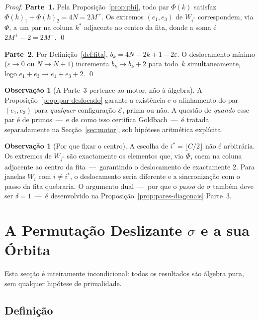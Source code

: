 \documentclass[12pt, a4paper]{article}
\theoremstyle{plain}
\theoremstyle{definition}
\newtheorem{remark}[theorem]{Observação}
\theoremstyle{remark}
\begin{document}
	\begin{proof}
		\textbf{Parte~1.}  Pela Proposição~\ref{prop:phi}, todo par
		$\Phi(k)$ satisfaz $\Phi(k)_1+\Phi(k)_2=4N=2M^+$.  Os extremos
		$(e_1,e_3)$ de $W_{i^*}$ correspondem, via $\Phi$, a um par na
		coluna $k^*$ adjacente ao centro da fita, donde a soma é
		$2M^+-2=2M^-$. \qed
		
		\textbf{Parte~2.}  Por Definição~\ref{def:fita},
		$b_k=4N-2k+1-2\varepsilon$.  O deslocamento mínimo
		($\varepsilon\to0$ ou $N\to N+1$) incrementa $b_k\to b_k+2$ para
		todo~$k$ simultaneamente, logo $e_1+e_3\to e_1+e_3+2$. \qed
	\end{proof}
	
	\begin{remark}[A Parte~3 pertence ao motor, não à álgebra]
		A Proposição~\ref{prop:par-deslocado} garante a existência e o
		alinhamento do par $(e_1,e_3)$ para \emph{qualquer} configuração
		$\mathcal{E}$, prima ou não.  A questão de \emph{quando} esse par
		é de primos~---~e de como isso certifica Goldbach~---~é tratada
		separadamente na Secção~\ref{sec:motor}, sob hipótese aritmética
		explícita.
	\end{remark}
	
	\begin{remark}[Por que fixar o centro]
		A escolha de $i^*=\lfloor C/2\rfloor$ não é arbitrária.  Os
		extremos de $W_{i^*}$ são exactamente os elementos que, via
		$\Phi$, caem na coluna adjacente ao centro da fita~---~garantindo
		o deslocamento de exactamente $2$.  Para janelas $W_i$ com
		$i\neq i^*$, o deslocamento seria diferente e a sincronização com
		o passo da fita quebraria.  O argumento dual~---~por que o
		\emph{passo} de $\sigma$ também deve ser $\delta=1$~---~é
		desenvolvido na Proposição~\ref{prop:pares-diagonais} Parte~3.
	\end{remark}
	
	\section{A Permutação Deslizante $\sigma$ e a sua Órbita}
	\label{sec:sigma}
	
	Esta secção é inteiramente incondicional: todos os resultados são
	álgebra pura, sem qualquer hipótese de primalidade.
	
	\subsection{Definição}
	
\end{document}
